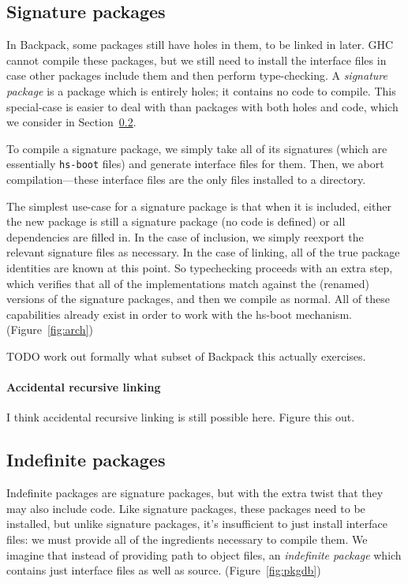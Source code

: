 \documentclass{article}
\begin{document}
\subsection{Signature packages}\label{sec:signature-packages}

In Backpack, some packages still have holes in them, to be linked in
later.  GHC cannot compile these packages, but we still need to install
the interface files in case other packages include them and then perform
type-checking.  A \emph{signature package} is a package which is entirely
holes; it contains no code to compile.  This special-case is easier to
deal with than packages with both holes and code, which we consider
in Section~\ref{sec:indefinite-packages}.

To compile a signature package, we simply take all of its signatures
(which are essentially \verb|hs-boot| files) and generate interface
files for them.  Then, we abort compilation---these interface files
are the only files installed to a directory.

The simplest use-case for a signature package is that when it is
included, either the new package is still a signature package (no
code is defined) or all dependencies are filled in.  In the case of inclusion,
we simply reexport the relevant signature files as necessary.  In
the case of linking, all of the true package identities are known at this
point.  So typechecking proceeds with an extra step, which verifies that
all of the implementations match against the (renamed) versions of the
signature packages, and then we compile as normal.  All of these capabilities
already exist in order to work with the hs-boot mechanism.  (Figure~\ref{fig:arch})

TODO work out formally what subset of Backpack this actually exercises.

\paragraph{Accidental recursive linking}  I think accidental recursive linking
is still possible here. Figure this out.

\subsection{Indefinite packages}\label{sec:indefinite-packages}

Indefinite packages are signature packages, but with the extra twist
that they may also include code.  Like signature packages, these
packages need to be installed, but unlike signature packages, it's
insufficient to just install interface files: we must provide all of the
ingredients necessary to compile them.  We imagine that instead of
providing path to object files, an \emph{indefinite package} which
contains just interface files as well as source.
(Figure~\ref{fig:pkgdb})
\end{document}
